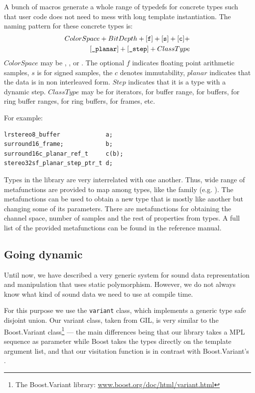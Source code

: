 A bunch of macros generate a whole range of typedefs for concrete
types such that user code does not need to mess with long template
instantiation. The naming pattern for these concrete types is:
\begin{equation}
\begin{aligned}
ColorSpace+BitDepth+[\mbox{\tt f}]+[\mbox{\tt s}]+[\mbox{\tt c}]+&\\
[\mbox{\tt \_planar}] + [\mbox{\tt\_step}] + ClassType&
\end{aligned}
\end{equation}
$ColorSpace$ may be , ,  or
. The optional $f$ indicates floating point arithmetic
samples, $s$ is for signed samples, the $c$ denotes immutability,
$planar$ indicates that the data is in non interleaved form. $Step$
indicates that it is a type with a dynamic step. $ClassType$ may be
 for iterators,  for buffer range, 
for buffers,  for ring buffer ranges,
 for ring buffers,  for frames, etc.

For example:
\begin{lstlisting}
lrstereo8_buffer             a;
surround16_frame;            b;
surround16c_planar_ref_t     c(b);
stereo32sf_planar_step_ptr_t d;
\end{lstlisting}

Types in the library are very interrelated with one another. Thus,
wide range of metafunctions are provided to map among types, like the
 family (e.g. ). The
 metafunctions can be used to obtain a new type
that is mostly like another but changing some of its parameters. There
are metafunctions for obtaining the channel space, number of samples
and the rest of properties from types. A full list of the provided
metafunctions can be found in the reference manual.

\subsection{Going dynamic}
\label{sec:ns-sound-end}

Until now, we have described a very generic system for sound data
representation and manipulation that uses static
polymorphism. However, we do not always know what kind of sound data
we need to use at compile time.

For this purpose we use the \texttt{variant} class, which implements a
generic type safe disjoint union. Our variant class, taken from GIL,
is very similar to the Boost.Variant class\footnote{The Boost.Variant
  library: \url{www.boost.org/doc/html/variant.html}} --- the main
differences being that our library takes a MPL sequence as parameter
while Boost takes the types directly on the template argument list,
and that our visitation function is  in
contrast with Boost.Variant's .

